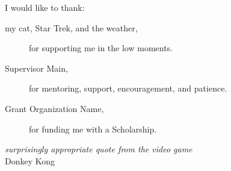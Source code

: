 \noindent I would like to thank:
\begin{description}
\item[my cat, Star Trek, and the weather,]
	for supporting me in the low moments.
\item[Supervisor Main,]
	for  mentoring, support, encouragement, and patience.
\item[Grant Organization Name,]
	for funding me with a Scholarship.
\end{description}

\begin{flushright}
\textit{surprisingly appropriate quote from \emph{the} video game}
\\
Donkey Kong \\
\end{flushright}
